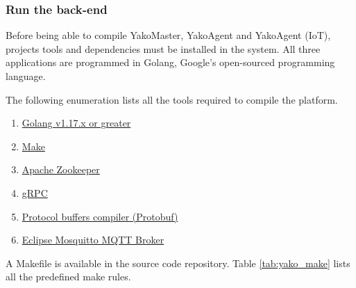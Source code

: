 \subsubsection{Run the back-end}

        Before being able to compile YakoMaster, YakoAgent and YakoAgent (IoT), projects tools and dependencies must be installed in the system. All three applications are programmed in Golang, Google's open-sourced programming language.
        
        The following enumeration lists all the tools required to compile the platform.
    
        \begin{enumerate}
            \item \href{https://go.dev/dl/}{Golang v1.17.x or greater}
            \item \href{https://www.gnu.org/software/make/}{Make}
            \item \href{https://zookeeper.apache.org/releases.html}{Apache Zookeeper}
            \item \href{https://grpc.io/docs/languages/go/quickstart/}{gRPC}
            \item \href{https://developers.google.com/protocol-buffers}{Protocol buffers compiler (Protobuf)}
            \item \href{https://mosquitto.org/download/}{Eclipse Mosquitto MQTT Broker}
        \end{enumerate}

        A Makefile is available in the source code repository. Table \ref{tab:yako_make} lists all the predefined make rules. 


